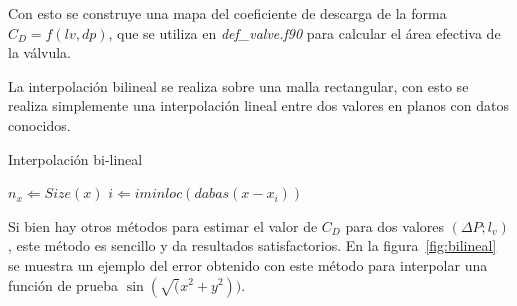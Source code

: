 Con esto se construye una mapa del coeficiente de descarga de la forma $C_D =
f(lv, dp)$, que se utiliza en \emph{def\_valve.f90} para calcular el área
efectiva de la válvula.

La interpolación bilineal se realiza sobre una malla rectangular, con esto se
realiza simplemente una interpolación lineal entre dos valores en planos con
datos conocidos.


\begin{algorithm}
 \caption{Interpolación bi-lineal}\label{algo:bilineal}
    \SetAlgoLined

    $n_x \Leftarrow Size(x)$\;
    $i \Leftarrow iminloc(dabas(x-x_i))$\;

\end{algorithm}

Si bien hay otros métodos para estimar el valor de $C_D$ para dos valores $(\Delta
P; l_v)$, este método es sencillo y da resultados satisfactorios.
%
En la figura~\ref{fig:bilineal} se muestra un ejemplo del error obtenido con
este método para interpolar una función de prueba $\sin(\sqrt(x^2 + y^2))$.

